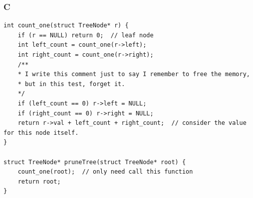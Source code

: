 \subsubsection*{C}
\begin{verbatim}
int count_one(struct TreeNode* r) {
    if (r == NULL) return 0;  // leaf node
    int left_count = count_one(r->left);
    int right_count = count_one(r->right);
    /**
    * I write this comment just to say I remember to free the memory,
    * but in this test, forget it.
    */
    if (left_count == 0) r->left = NULL;
    if (right_count == 0) r->right = NULL;
    return r->val + left_count + right_count;  // consider the value for this node itself.
}

struct TreeNode* pruneTree(struct TreeNode* root) {
    count_one(root);  // only need call this function
    return root;
}
\end{verbatim}

\newpage

